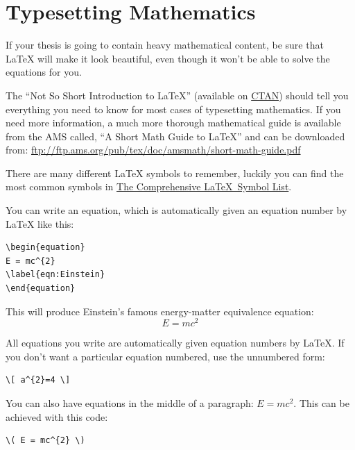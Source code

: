 \section{Typesetting Mathematics}

If your thesis is going to contain heavy mathematical content, be sure that LaTeX will make it look beautiful, even though it won't be able to solve the equations for you.

The \enquote{Not So Short Introduction to \LaTeX} (available on \href{http://www.ctan.org/tex-archive/info/lshort/english/lshort.pdf}{CTAN}) should tell you everything you need to know for most cases of typesetting mathematics. If you need more information, a much more thorough mathematical guide is available from the AMS called, \enquote{A Short Math Guide to \LaTeX} and can be downloaded from:
\url{ftp://ftp.ams.org/pub/tex/doc/amsmath/short-math-guide.pdf}

There are many different LaTeX symbols to remember, luckily you can find the most common symbols in \href{http://ctan.org/pkg/comprehensive}{The Comprehensive \LaTeX~Symbol List}.

You can write an equation, which is automatically given an equation number by LaTeX like this:
\begin{lstlisting}[language={[LaTeX]TeX}]
\begin{equation}
E = mc^{2}
\label{eqn:Einstein}
\end{equation}
\end{lstlisting}

This will produce Einstein's famous energy-matter equivalence equation:
\begin{equation}
E = mc^{2}
\label{eqn:Einstein}
\end{equation}

All equations you write are automatically given equation numbers by LaTeX. If you don't want a particular equation numbered, use the unnumbered form:

\begin{lstlisting}[language={[LaTeX]TeX}]
\[ a^{2}=4 \]
\end{lstlisting}

You can also have equations in the middle of a paragraph: \( E = mc^{2} \). This can be achieved with this code: 

\begin{lstlisting}[language={[LaTeX]TeX}]
\( E = mc^{2} \)
\end{lstlisting}


